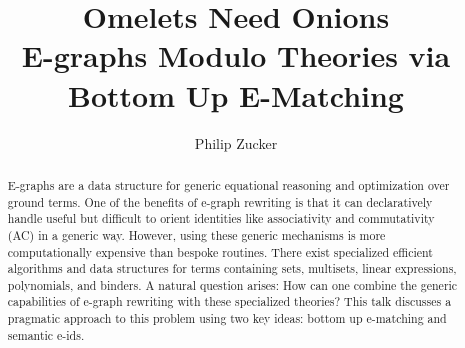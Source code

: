 \documentclass[sigconf,authordraft]{acmart}
\begin{document}
\title{Omelets Need Onions \\ \large E-graphs Modulo Theories via Bottom Up E-Matching}


\author{Philip Zucker}


\begin{abstract}
    E-graphs\cite{eggpaper} are a data structure for generic equational reasoning and optimization over ground terms. One of
     the benefits of e-graph rewriting is that it can declaratively handle useful but difficult to orient identities like 
     associativity and commutativity (AC) in a generic way. However, using these generic mechanisms
      is more computationally expensive than bespoke routines. There exist specialized efficient
       algorithms and data structures for terms containing sets, multisets, linear expressions, polynomials, and binders.
        A natural question arises: How can one combine the generic capabilities of e-graph rewriting with these specialized theories?
        This talk discusses a pragmatic approach to this problem using two key ideas: bottom up e-matching and semantic e-ids.


\end{abstract}




\maketitle
\end{document}
